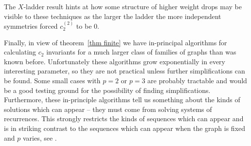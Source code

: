 \documentclass[12pt]{amsart}
\numberwithin{definition}{section}
\begin{document}
The $X$-ladder result hints at how some structure of higher weight drops may be visible to these techniques as the larger the ladder the more independent symmetries forced $c_2^{(2)}$ to be $0$.

Finally, in view of theorem~\ref{thm finite} we have in-principal algorithms for calculating $c_2$ invariants for a much larger class of families of graphs than was known before.  Unfortunately these algorithms grow exponentially in every interesting parameter, so they are not practical unless further simplifications can be found.  Some small cases with $p=2$ or $p=3$ are probably tractable and would be a good testing ground for the possibility of finding simplifications.  Furthermore, these in-principle algorithms tell us something about the kinds of solutions which can appear -- they must come from solving systems of recurrences.  This strongly restricts the kinds of sequences which can appear and is in striking contrast to the sequences which can appear when the graph is fixed and $p$ varies, see \cite{BrownSchnetz2013}.
\end{document}
